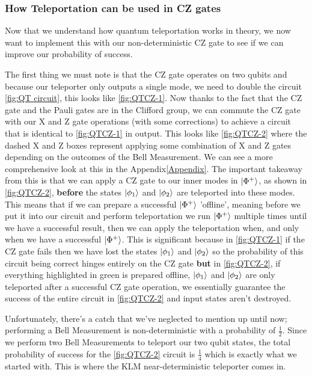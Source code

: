 \subsubsection{How Teleportation can be used in CZ gates}
Now that we understand how quantum teleportation works in theory, we now want to implement this with our non-deterministic CZ gate to see if we can improve our probability of success.
\par 
The first thing we must note is that the CZ gate operates on two qubits and because our teleporter only outputs a single mode, we need to double the circuit \ref{fig:QT circuit}, this looks like \ref{fig:QTCZ-1}. Now thanks to the fact that the CZ gate and the Pauli gates are in the Clifford group, we can commute the CZ gate with our X and Z gate operations (with some corrections) to achieve a circuit that is identical to \ref{fig:QTCZ-1} in output. This looks like \ref{fig:QTCZ-2} where the dashed X and Z boxes represent applying some combination of X and Z gates depending on the outcomes of the Bell Measurement. We can see a more comprehensive look at this in the Appendix\ref{Appendix}. The important takeaway from this is that we can apply a CZ gate to our inner modes in $\ket{\Phi^+}$, as shown in \ref{fig:QTCZ-2}, \textbf{before} the states $\ket{\phi_1}$ and $\ket{\phi_2}$ are teleported into these modes. This means that if we can prepare a successful $\ket{\Phi^+}$ 'offline', meaning before we put it into our circuit and perform teleportation we run $\ket{\Phi^+}$ multiple times until we have a successful result, then we can apply the teleportation when, and only when we have a successful $\ket{\Phi^+}$. This is significant because in \ref{fig:QTCZ-1} if the CZ gate fails then we have lost the states $\ket{\phi_1}$ and $\ket{\phi_2}$ so the probability of this circuit being correct hinges entirely on the CZ gate \textbf{but} in \ref{fig:QTCZ-2}, if everything highlighted in green is prepared offline, $\ket{\phi_1}$ and $\ket{\phi_2}$ are only teleported after a successful CZ gate operation, we essentially guarantee the success of the entire circuit in \ref{fig:QTCZ-2} and input states aren't destroyed.
\par
Unfortunately, there's a catch that we've neglected to mention up until now; performing a Bell Measurement is non-deterministic with a probability of $\frac{1}{2}$. Since we perform two Bell Measurements to teleport our two qubit states, the total probability of success for the \ref{fig:QTCZ-2} circuit is $\frac{1}{4}$ which is exactly what we started with. This is where the KLM near-deterministic teleporter comes in. 



